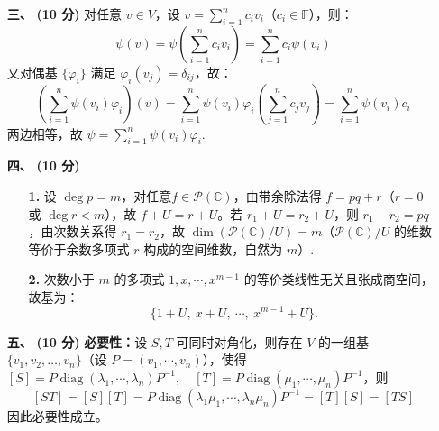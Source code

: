 \documentclass{ctexart}
\begin{document}
\begin{enumerate}
    \item[\textbf{三、}] \textbf{(10 分)} 对任意 \(v\in V\)，设 \(v = \displaystyle\sum_{i=1}^n c_i v_i\)（\(c_i\in\mathbb{F}\)），则：  
    \[
    \psi(v) = \psi\left(\sum_{i=1}^n c_i v_i\right) = \sum_{i=1}^n c_i \psi(v_i)
    \]  
    又对偶基 \(\{\varphi_i\}\) 满足 \(\varphi_i(v_j)=\delta_{ij}\)，故：  
    \[
    \left(\sum_{i=1}^n \psi(v_i)\varphi_i\right)(v) = \sum_{i=1}^n \psi(v_i)\varphi_i\left(\sum_{j=1}^n c_j v_j\right) = \sum_{i=1}^n \psi(v_i)c_i
    \]  
    两边相等，故 \(\psi = \displaystyle\sum_{i=1}^n \psi(v_i)\varphi_i\).
    \item[\textbf{四、}] \textbf{(10 分)}
    \begin{enumerate}
        \item[\textbf{1.}] 设 \(\deg p = m\)，对任意\(f\in\mathcal{P}(\mathbb{C})\)，由带余除法得 \(f = pq + r\)（\(r=0\) 或 \(\deg r < m\)），故 \(f + U = r + U\)。若 \(r_1 + U = r_2 + U\)，则 \(r_1 - r_2 = pq\)，由次数关系得 \(r_1 = r_2\)，故 \(\dim(\mathcal{P}(\mathbb{C})/U) = m\)（$\mathcal{P}(\mathbb{C})/U$ 的维数等价于余数多项式 $r$ 构成的空间维数，自然为 $m$）.
        \item[\textbf{2.}] 次数小于 \(m\) 的多项式 \(1,x,\cdots,x^{m-1}\) 的等价类线性无关且张成商空间，故基为：\[\{1 + U,\ x + U,\ \cdots,\ x^{m-1} + U\}.\]
    \end{enumerate}
    \item[\textbf{五、}] \textbf{(10 分)} \textbf{必要性：}设 \(S,T\) 可同时对角化，则存在 \(V\) 的一组基 \(\{v_1, v_2, \ldots, v_n\}\)（设 $P=(v_1,\cdots,v_n)$），使得 \([S] = P\operatorname{diag}(\lambda_1,\cdots,\lambda_n)P^{-1}, \quad [T] = P\operatorname{diag}(\mu_1,\cdots,\mu_n)P^{-1}\)，则
    \[ [ST] = [S][T] = P\operatorname{diag}(\lambda_1\mu_1,\cdots,\lambda_n\mu_n)P^{-1} = [T][S] = [TS] \]  
    因此必要性成立。


\end{enumerate}
\end{document}
